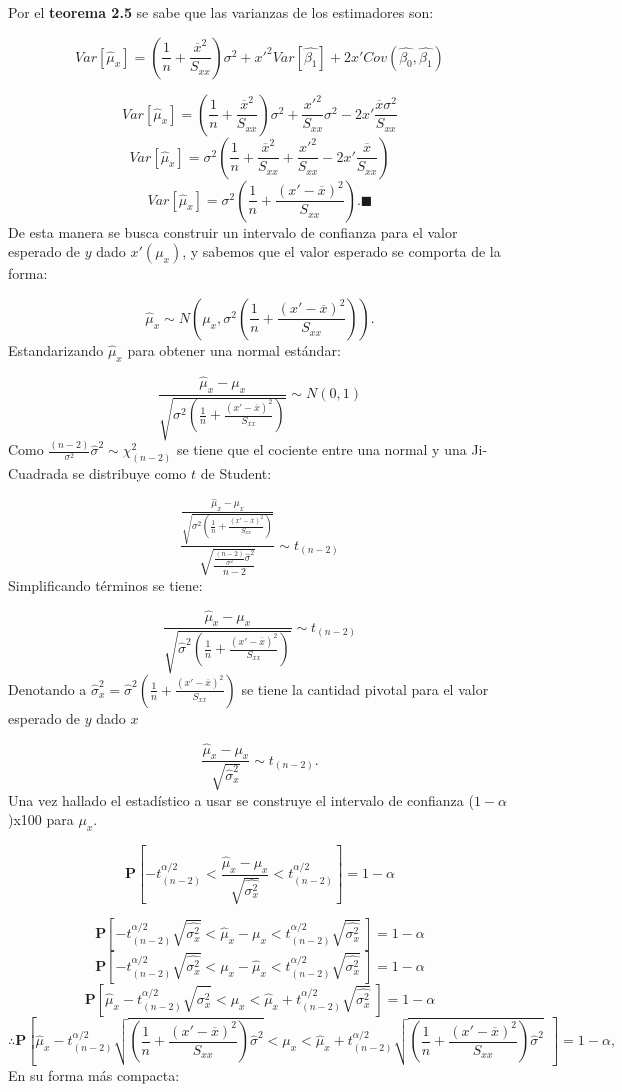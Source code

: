 \documentclass[
  a4paper,
  oneside,
  openany]{book}
\begin{document}
Por el \textbf{teorema 2.5} se sabe que las varianzas de los estimadores son:

\[Var[\hat{\mu}_{x}]=\left( \frac{1}{n}+\frac{\overline{x}^2}{S_{xx}}\right)\sigma^2+x'^2Var[\hat{\beta_{1}}]+2x'Cov(\hat{\beta_{0}},\hat{\beta_{1}})\]

\[Var[\hat{\mu}_{x}]=\left( \frac{1}{n}+\frac{\overline{x}^2}{S_{xx}}\right)\sigma^2+\frac{x'^2}{S_{xx}}\sigma^2-2x'\frac{\overline{x}\sigma^2}{S_{xx}}\]
\[Var[\hat{\mu}_{x}]=\sigma^2\left( \frac{1}{n}+\frac{\overline{x}^2}{S_{xx}}+\frac{x'^2}{S_{xx}}-2x'\frac{\overline{x}}{S_{xx}}\right)\]
\[Var[\hat{\mu}_{x}]=\sigma^2\left( \frac{1}{n}+\frac{(x'-\overline{x})^2}{S_{xx}}\right). \blacksquare\]
De esta manera se busca construir un intervalo de confianza para el valor esperado de \(y\) dado \(x'(\mu_{x})\), y sabemos que el valor esperado se comporta de la forma:

\[\hat{\mu}_{x}\sim N\left(\mu_{x},\sigma^2\left( \frac{1}{n}+\frac{(x'-\overline{x})^2}{S_{xx}}\right)\right).\]
Estandarizando \(\hat{\mu}_{x}\) para obtener una normal estándar:

\[\frac{\hat{\mu}_{x}-\mu_{x}}{\sqrt{\sigma^2\left( \frac{1}{n}+\frac{(x'-\overline{x})^2}{S_{xx}}\right)}}\sim N(0,1)\]
Como \(\frac{(n-2)}{\sigma^2}\hat{\sigma}^2\sim\chi^2_{(n-2)}\) se tiene que el cociente entre una normal y una Ji-Cuadrada se distribuye como \(t\) de Student:

\[\frac{\frac{\hat{\mu}_{x}-\mu_{x}}{\sqrt{\sigma^2\left( \frac{1}{n}+\frac{(x'-\overline{x})^2}{S_{xx}}\right)}}}{\sqrt{\frac{\frac{(n-2)}{\sigma^2}\hat{\sigma}^2}{n-2}}}\sim t_{(n-2)}\]
Simplificando términos se tiene:

\[\frac{\hat{\mu}_{x}-\mu_{x}}{\sqrt{\hat{\sigma}^2\left( \frac{1}{n}+\frac{(x'-\overline{x})^2}{S_{xx}}\right)}}\sim t_{(n-2)}\]
Denotando a \(\hat{\sigma}_{x}^2=\hat{\sigma}^2\left(\frac{1}{n}+\frac{(x'-\overline{x})^2}{S_{xx}}\right)\) se tiene la cantidad pivotal para el valor esperado de \(y\) dado \(x\)

\[\frac{\hat{\mu}_{x}-\mu_{x}}{\sqrt{\hat{\sigma}_{x}^2}}\sim t_{(n-2)}.\]
Una vez hallado el estadístico a usar se construye el intervalo de confianza (\(1-\alpha\))x100 para \(\mu_{x}\).

\[\mathbf{P}\left[-t_{(n-2)}^{\alpha/2} < \frac{\hat{\mu}_{x}-\mu_{x}}{\sqrt{\hat{\sigma_{x}^2}}} < t_{(n-2)}^{\alpha/2}\right]=1-\alpha\]

\[\mathbf{P}\left[-t_{(n-2)}^{\alpha/2}\sqrt{\hat{\sigma_{x}^2}}<\hat{\mu}_{x}-\mu_{x}<t_{(n-2)}^{\alpha/2}\sqrt{\hat{\sigma_{x}^2}} \ \right]=1-\alpha\]
\[\mathbf{P}\left[-t_{(n-2)}^{\alpha/2}\sqrt{\hat{\sigma_{x}^2}}<\mu_{x}-\hat{\mu}_{x}<t_{(n-2)}^{\alpha/2}\sqrt{\hat{\sigma_{x}^2}} \ \right]=1-\alpha\]
\[\mathbf{P}\left[\hat{\mu}_{x}-t_{(n-2)}^{\alpha/2}\sqrt{\hat{\sigma_{x}^2}}<\mu_{x}<\hat{\mu}_{x}+t_{(n-2)}^{\alpha/2}\sqrt{\hat{\sigma_{x}^2}} \ \right]=1-\alpha\]
\[\therefore \mathbf{P}\left[\hat{\mu}_{x}-t_{(n-2)}^{\alpha/2}\sqrt{\left( \frac{1}{n}+\frac{(x'-\overline{x})^2}{S_{xx}}\right)\hat{\sigma}^2}<\mu_{x}<\hat{\mu}_{x}+t_{(n-2)}^{\alpha/2}\sqrt{\left( \frac{1}{n}+\frac{(x'-\overline{x})^2}{S_{xx}}\right)\hat{\sigma}^2} \ \ \right]=1-\alpha,\]
En su forma más compacta:
\end{document}
